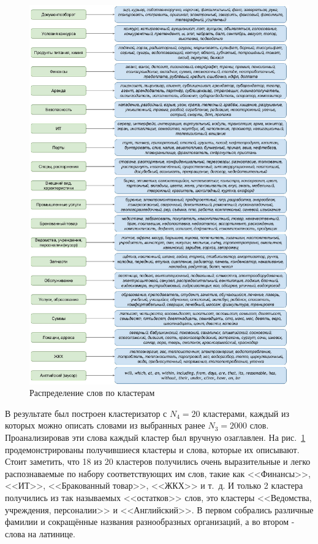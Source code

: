 \documentclass[12pt]{article}
\begin{document}
\begin{center}
	\begin{figure}[h!]
		\centering
		\includegraphics[scale=0.7]{images/im4.eps}
		\caption{Распределение слов по кластерам}
		\label{im4}
	\end{figure}
\end{center}


В результате был построен кластеризатор с $N_4 = 20$ кластерами, каждый из которых можно описать словами из выбранных ранее $N_3 = 2000$ слов. Проанализировав эти слова каждый кластер был вручную озаглавлен. На рис.~\ref{im4} продемонстрированы получившиеся кластеры и слова, которые их описывают. Стоит заметить, что 18 из 20 кластеров получились очень выразительные и легко распознаваемые по набору соответствующих им слов, такие как <<Финансы>>, <<ИТ>>, <<Бракованный товар>>, <<ЖКХ>> и т.~д. И только 2 кластера получились из так называемых <<остатков>> слов, это кластеры <<Ведомства, учреждения, персоналии>> и <<Английский>>. В первом собрались различные фамилии и сокращённые названия разнообразных организаций, а во втором - слова на латинице.
\end{document}
